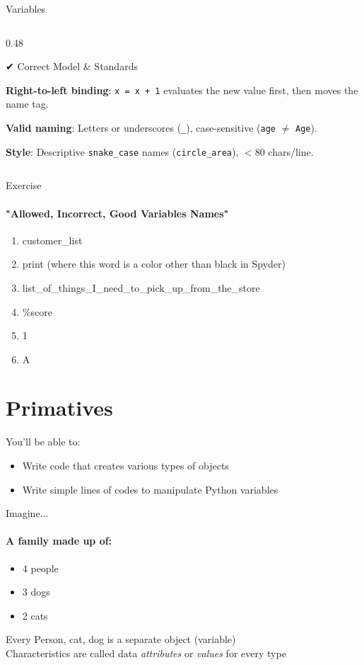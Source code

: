 \documentclass[aspectratio=169,19pt,english]{beamer}
\begin{document}
{\begin{frame}{Variables}
\begin{columns}[t]
		\begin{column}{0.48\textwidth}
			\begin{block}{✔ Correct Model \& Standards}
				
				\begin{itemize}
					\small{
					\item \textbf{Right-to-left binding}: \texttt{x = x + 1} evaluates the new value first, then moves the name tag.
					\item \textbf{Valid naming}: Letters or underscores (\texttt{\_}), case-sensitive (\texttt{age} $\neq$ \texttt{Age}).
					\item \textbf{Style}: Descriptive \texttt{snake\_case} names (\texttt{circle\_area}), $<80$ chars/line.}
				\end{itemize}
			\end{block}
		\end{column}
	\end{columns}
\end{frame}

\begin{frame}{Exercise}
	\framesubtitle{"Allowed, Incorrect, Good Variables Names"}
	\begin{enumerate}[label=\arabic*.-]
	\item customer\_list 
	\item print (where this word is a color other than black in Spyder) 
	\item list\_of\_things\_I\_need\_to\_pick\_up\_from\_the\_store 
	\item \%score 
	\item 1 
	\item A
\end{enumerate}
	
\end{frame}
 \section{Primatives}
\begin{frame}
	You'll be able to:
	\begin{itemize}
		\item[*] Write code that creates various types of objects
		\item[*] Write simple lines of codes to manipulate Python variables
	\end{itemize}
\end{frame}
\begin{frame}{Imagine...}
	\framesubtitle{A family made up of:}
\begin{itemize}
	\item[+] 4 people
	\item[+] 3 dogs
	\item[+] 2 cats 
\end{itemize}
Every Person, cat, dog is a separate object (variable)\\
Characteristics are called data \textit{attributes} or \textit{values} for every type
	

\end{frame}}
\end{document}
